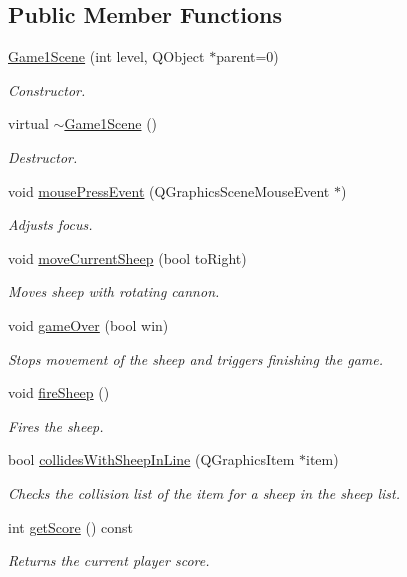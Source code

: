 \subsection*{\-Public \-Member \-Functions}
\begin{DoxyCompactItemize}
\item 
\hyperlink{classGame1Scene_a9583982b66f78ed0dbca103ba2e26d77}{\-Game1\-Scene} (int level, \-Q\-Object $\ast$parent=0)
\begin{DoxyCompactList}\small\item\em \-Constructor. \end{DoxyCompactList}\item 
virtual \hyperlink{classGame1Scene_a810e661e0de4105509207c86bc35cbe2}{$\sim$\-Game1\-Scene} ()
\begin{DoxyCompactList}\small\item\em \-Destructor. \end{DoxyCompactList}\item 
void \hyperlink{classGame1Scene_a3f20ac9bd39e4506c1dca07428a7e1b2}{mouse\-Press\-Event} (\-Q\-Graphics\-Scene\-Mouse\-Event $\ast$)
\begin{DoxyCompactList}\small\item\em \-Adjusts focus. \end{DoxyCompactList}\item 
void \hyperlink{classGame1Scene_ad6356f0a62d21fefd26110d6ea4ab10a}{move\-Current\-Sheep} (bool to\-Right)
\begin{DoxyCompactList}\small\item\em \-Moves sheep with rotating cannon. \end{DoxyCompactList}\item 
void \hyperlink{classGame1Scene_abd59b6c83eb85402d1f07ad06728f05b}{game\-Over} (bool win)
\begin{DoxyCompactList}\small\item\em \-Stops movement of the sheep and triggers finishing the game. \end{DoxyCompactList}\item 
void \hyperlink{classGame1Scene_a82ce3eadf3a51778be131f8b92632991}{fire\-Sheep} ()
\begin{DoxyCompactList}\small\item\em \-Fires the sheep. \end{DoxyCompactList}\item 
bool \hyperlink{classGame1Scene_ac171b3011a3526480c9483b2a486a984}{collides\-With\-Sheep\-In\-Line} (\-Q\-Graphics\-Item $\ast$item)
\begin{DoxyCompactList}\small\item\em \-Checks the collision list of the item for a sheep in the sheep list. \end{DoxyCompactList}\item 
int \hyperlink{classGame1Scene_a8698a81a65f06e6b07cdf1da92ba9d22}{get\-Score} () const 
\begin{DoxyCompactList}\small\item\em \-Returns the current player score. \end{DoxyCompactList}\end{DoxyCompactItemize}


